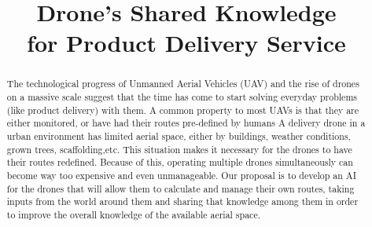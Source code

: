 \documentclass[conference]{IEEEtran}
\begin{document}
%
\title{Drone’s Shared Knowledge\\for Product Delivery Service}


% 
\author{
}




\maketitle

\begin{abstract}
The technological progress of Unmanned Aerial Vehicles (UAV) and the rise of drones on a massive scale suggest that the time has come to start solving everyday problems (like product delivery) with them.
A common property to most UAVs is that they are either monitored, or have had their routes pre-defined by humans
A delivery drone in a urban environment has limited aerial space, either by buildings, weather conditions, grown trees, scaffolding,etc.
This situation makes it necessary for the drones to have their routes redefined.
Because of this, operating multiple drones simultaneously can become way too expensive and even unmanageable.
Our proposal is to develop an AI for the drones that will allow them to calculate and manage their own routes, taking inputs from the world around them and sharing that knowledge among them in order to improve the overall knowledge of the available aerial space.
\end{abstract}
\end{document}
